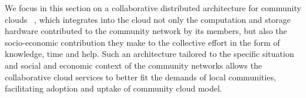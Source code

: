 %
%
We focus in this section on a collaborative distributed architecture for community clouds ~\cite{Khan2014Architecture}, 
which integrates into the cloud not only the computation and storage hardware contributed to the community network by its members, 
but also the socio-economic contribution they make to the collective effort in the form of knowledge, time and help.
Such an architecture tailored to the specific situation and social and economic context of the community networks 
allows the collaborative cloud services to better fit the demands of local communities, 
facilitating adoption and uptake of community cloud model.
